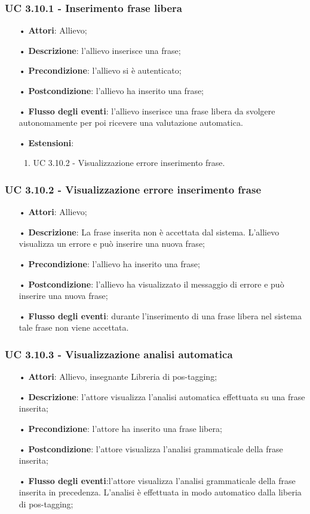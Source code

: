 \subsubsection{UC 3.10.1 - Inserimento frase libera}
\begin{itemize}
	\item[•]\textbf{Attori}: Allievo;
	\item[•]\textbf{Descrizione}: l'allievo inserisce una frase;
	\item[•]\textbf{Precondizione}: l'allievo si è autenticato;
	\item[•]\textbf{Postcondizione}: l'allievo ha inserito una frase;
	\item[•]\textbf{Flusso degli eventi}: l'allievo inserisce una frase libera da svolgere autonomamente per poi ricevere una valutazione automatica.
	\item[•]\textbf{Estensioni}:
	\begin{enumerate}
		\item UC 3.10.2 - Visualizzazione errore inserimento frase.
	\end{enumerate}
\end{itemize}

\subsubsection{UC 3.10.2 - Visualizzazione errore inserimento frase}
\begin{itemize}
	\item[•]\textbf{Attori}: Allievo;
	\item[•]\textbf{Descrizione}: La frase inserita non è accettata dal sistema. L'allievo visualizza un errore e può inserire una nuova frase;
	\item[•]\textbf{Precondizione}: l'allievo ha inserito una frase;
	\item[•]\textbf{Postcondizione}: l'allievo ha visualizzato il messaggio di errore e può inserire una nuova frase;
	\item[•]\textbf{Flusso degli eventi}: durante l'inserimento di una frase libera nel sistema tale frase non viene accettata.
\end{itemize}

\subsubsection{UC 3.10.3 - Visualizzazione analisi automatica}
\begin{itemize}
	\item[•]\textbf{Attori}: Allievo, insegnante Libreria di pos-tagging;
	\item[•]\textbf{Descrizione}: l'attore visualizza l'analisi automatica effettuata su una frase inserita;
	\item[•]\textbf{Precondizione}: l'attore ha inserito una frase libera;
	\item[•]\textbf{Postcondizione}: l'attore visualizza l'analisi grammaticale della frase inserita;
	\item[•]\textbf{Flusso degli eventi}:l'attore visualizza l'analisi grammaticale della frase inserita in precedenza. L'analisi è effettuata in modo automatico dalla liberia di pos-tagging;
\end{itemize}


